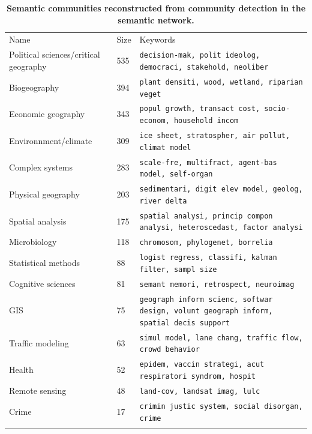 \documentclass[10pt]{article}
\begin{document}
\begin{table}
\caption{\textbf{Semantic communities reconstructed from community detection in the semantic network.}}
\label{tab:domains}
\hspace{-2cm}
\begin{tabular}{lll}
\hline\noalign{\smallskip}
Name & Size & Keywords  \\
\noalign{\smallskip}\hline\noalign{\smallskip}
Political sciences/critical geography & 535 & \texttt{decision-mak, polit ideolog, democraci, stakehold, neoliber} \\
Biogeography & 394 & \texttt{plant densiti, wood, wetland, riparian veget} \\
Economic geography & 343 &  \texttt{popul growth, transact cost, socio-econom, household incom} \\
Environnment/climate & 309 & \texttt{ice sheet, stratospher, air pollut, climat model} \\
Complex systems & 283 & \texttt{scale-fre, multifract, agent-bas model, self-organ} \\
Physical geography & 203 & \texttt{sedimentari, digit elev model, geolog, river delta} \\
Spatial analysis & 175 & \texttt{spatial analysi, princip compon analysi, heteroscedast, factor analysi} \\
Microbiology & 118 & \texttt{chromosom, phylogenet, borrelia} \\
Statistical methods & 88 & \texttt{logist regress, classifi, kalman filter, sampl size} \\
Cognitive sciences & 81 & \texttt{semant memori, retrospect, neuroimag} \\
GIS & 75 & \texttt{geograph inform scienc, softwar design, volunt geograph inform, spatial decis support} \\
Traffic modeling & 63 & \texttt{simul model, lane chang, traffic flow, crowd behavior} \\
Health & 52 & \texttt{epidem, vaccin strategi, acut respiratori syndrom, hospit} \\
Remote sensing & 48 & \texttt{land-cov, landsat imag, lulc} \\
Crime & 17 & \texttt{crimin justic system, social disorgan, crime} \\
\noalign{\smallskip}\hline
\end{tabular}
\end{table}
\end{document}
